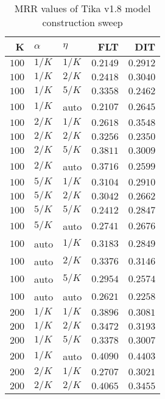 
\begin{table}
\begin{spacing}{1.2}
\centering
\caption{MRR values of Tika v1.8 model construction sweep}
\label{table:tika_model_sweep}
\vspace{0.2em}
\parbox{.45\linewidth}{\centering \begin{tabular}{rll|rr}
\toprule
    K &  $\alpha$ &    $\eta$ & FLT &   DIT \\
\midrule
$100$ &  $1/K$ &  $1/K$ &         $0.2149$ & $0.2912$ \\
$100$ &  $1/K$ &  $2/K$ &         $0.2418$ & $0.3040$ \\
$100$ &  $1/K$ &  $5/K$ &         $0.3358$ & $0.2462$ \\
$100$ &  $1/K$ &   auto &         $0.2107$ & $0.2645$ \\
$100$ &  $2/K$ &  $1/K$ &         $0.2618$ & $0.3548$ \\
$100$ &  $2/K$ &  $2/K$ &         $0.3256$ & $0.2350$ \\
$100$ &  $2/K$ &  $5/K$ &         $0.3811$ & $0.3009$ \\
$100$ &  $2/K$ &   auto &         $0.3716$ & $0.2599$ \\
$100$ &  $5/K$ &  $1/K$ &         $0.3104$ & $0.2910$ \\
$100$ &  $5/K$ &  $2/K$ &         $0.3042$ & $0.2662$ \\
$100$ &  $5/K$ &  $5/K$ &         $0.2412$ & $0.2847$ \\
$100$ &  $5/K$ &   auto &         $0.2741$ & $0.2676$ \\
$100$ &   auto &  $1/K$ &         $0.3183$ & $0.2849$ \\
$100$ &   auto &  $2/K$ &         $0.3376$ & $0.3146$ \\
$100$ &   auto &  $5/K$ &         $0.2954$ & $0.2574$ \\
$100$ &   auto &   auto &         $0.2621$ & $0.2258$ \\
$200$ &  $1/K$ &  $1/K$ &         $0.3896$ & $0.3081$ \\
$200$ &  $1/K$ &  $2/K$ &         $0.3472$ & $0.3193$ \\
$200$ &  $1/K$ &  $5/K$ &         $0.3378$ & $0.3007$ \\
$200$ &  $1/K$ &   auto &         $0.4090$ & $0.4403$ \\
$200$ &  $2/K$ &  $1/K$ &         $0.2707$ & $0.3021$ \\
$200$ &  $2/K$ &  $2/K$ &         $0.4065$ & $0.3455$ \\

\end{tabular}}
\end{spacing}
\end{table}
